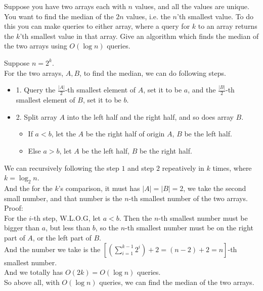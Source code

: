 \problem{}
Suppose you have two arrays each with $n$ values, and all the values are unique.  You want to find the median of the $2n$ values, i.e. the $n$'th smallest value.  To do this you can make queries to either array, where a query for $k$ to an array returns the $k$'th smallest value in that array.  Give an algorithm which finds the median of the two arrays using $O(\log n)$ queries.  

\solution{}

Suppose $n=2^k$.\\
For the two arrays, $A,B$, to find the median, we can do following steps.
\begin{itemize}
    \item 1. Query the $\frac{|A|}{2}$-th smallest element of $A$, set it to be $a$, and the $\frac{|B|}{2}$-th smallest element of $B$, set it to be $b$.
    \item 2. Split array $A$ into the left half and the right half, and so does array $B$.
    \begin{itemize}
        \item If $a<b$, let the $A$ be the right half of origin $A$, $B$ be the left half.
        \item Else $a>b$, let $A$ be the left half, $B$ be the right half.
    \end{itemize}
\end{itemize}

We can recursively following the step $1$ and step $2$ repeatively in $k$ times, where $k=\log_{2}{n}$.\\
And the for the $k$'s comparison, it must has $|A|=|B|=2$, we take the second small number, and that number is the $n$-th smallest number of the two arrays.\\

Proof:\\
For the $i$-th step, W.L.O.G, let $a<b$. Then the $n$-th smallest number must be bigger than $a$, but less than $b$, so the $n$-th smallest number must be on the right part of $A$, or the left part of $B$.\\
And the number we take is the $\left[\left(\sum\limits_{i=1}^{k-1}2^i\right)+2=(n-2)+2=n\right]$-th smallest number.\\
And we totally has $O(2k)=O(\log n)$ queries.\\

So above all, with $O(\log n)$ queries, we can find the median of the two arrays.\\

\newpage
